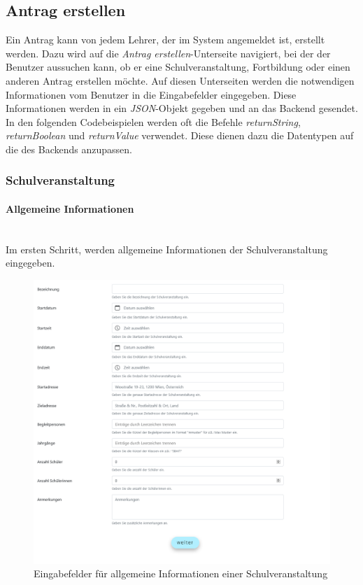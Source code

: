 \subsection{Antrag erstellen}
Ein Antrag kann von jedem Lehrer, der im System angemeldet ist, erstellt werden. Dazu wird auf die \textit{Antrag erstellen}-Unterseite navigiert, bei der der Benutzer aussuchen kann, ob er eine Schulveranstaltung, Fortbildung oder einen anderen Antrag erstellen möchte. Auf diesen Unterseiten werden die notwendigen Informationen vom Benutzer in die Eingabefelder eingegeben. Diese Informationen werden in ein \textit{JSON}-Objekt gegeben und an das Backend gesendet.
\\
In den folgenden Codebeispielen werden oft die Befehle \textit{returnString}, \textit{returnBoolean} und \textit{returnValue} verwendet. Diese dienen dazu die Datentypen auf die des Backends anzupassen. 
\subsubsection{Schulveranstaltung}
\paragraph{Allgemeine Informationen}~\\
Im ersten Schritt, werden allgemeine Informationen der Schulveranstaltung eingegeben.
\begin{figure}[H]
	\centering
	\includegraphics[width=1\linewidth]{images/schoolgeneral}
	\caption[Schulveranstaltung]{Eingabefelder für allgemeine Informationen einer Schulveranstaltung}
	\label{fig:schoolgeneral}
\end{figure}
